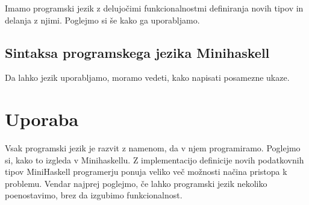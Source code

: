 \documentclass[12pt,a4paper,openany]{book}
\begin{document}
Imamo programski jezik z delujočimi funkcionalnostmi definiranja novih tipov in delanja z njimi. Poglejmo si še kako ga uporabljamo.

\section{Sintaksa programskega jezika Minihaskell}
Da lahko jezik uporabljamo, moramo vedeti, kako napisati posamezne ukaze. 

\chapter{Uporaba}
Vsak programski jezik je razvit z namenom, da v njem programiramo. Poglejmo si, kako to izgleda v Minihaskellu. Z implementacijo definicije novih podatkovnih tipov MiniHaskell programerju 
ponuja veliko več možnosti načina pristopa k problemu. Vendar najprej poglejmo, če lahko programski jezik nekoliko poenostavimo, brez da izgubimo funkcionalnost. 
\end{document}
